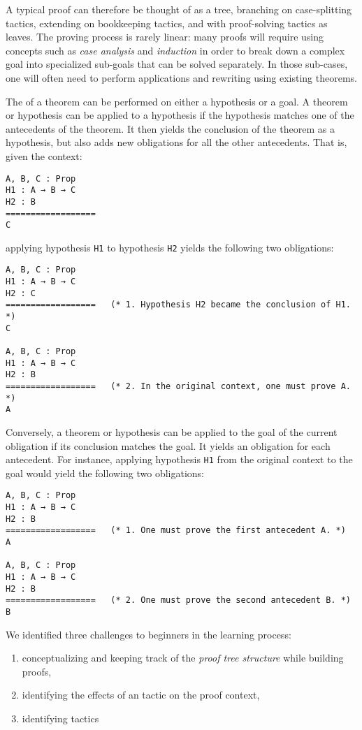 A typical proof can therefore be thought of as a tree, branching on
case-splitting tactics, extending on bookkeeping tactics, and with proof-solving
tactics as leaves.  The proving process is rarely linear: many proofs will
require using concepts such as \emph{case analysis} and \emph{induction} in
order to break down a complex goal into specialized sub-goals that can be solved
separately.  In those sub-cases, one will often need to perform applications and
rewriting using existing theorems.

The  of a theorem can be performed on either a hypothesis or
a goal.  A theorem or hypothesis can be applied to a hypothesis if the
hypothesis matches one of the antecedents of the theorem.  It then yields the
conclusion of the theorem as a hypothesis, but also adds new obligations for all
the other antecedents. That is, given the context:

\begin{verbatim}
A, B, C : Prop
H1 : A → B → C
H2 : B
==================
C
\end{verbatim}

applying hypothesis \texttt{H1} to hypothesis \texttt{H2}
yields the following two obligations:

\begin{verbatim}
A, B, C : Prop
H1 : A → B → C
H2 : C
==================   (* 1. Hypothesis H2 became the conclusion of H1. *)
C

A, B, C : Prop
H1 : A → B → C
H2 : B
==================   (* 2. In the original context, one must prove A. *)
A
\end{verbatim}

Conversely, a theorem or hypothesis can be applied to the goal of the current
obligation if its conclusion matches the goal.  It yields an obligation for each
antecedent.  For instance, applying hypothesis \texttt{H1} from the
original context to the goal would yield the following two obligations:

\begin{verbatim}
A, B, C : Prop
H1 : A → B → C
H2 : B
==================   (* 1. One must prove the first antecedent A. *)
A

A, B, C : Prop
H1 : A → B → C
H2 : B
==================   (* 2. One must prove the second antecedent B. *)
B
\end{verbatim}


We identified three challenges to beginners in the learning process:

\begin{enumerate}

  \item conceptualizing and keeping track of the \emph{proof tree structure}
while building proofs,

  \item identifying the effects of an \Ltac{} tactic on the proof context,

  \item identifying tactics

\end{enumerate}
